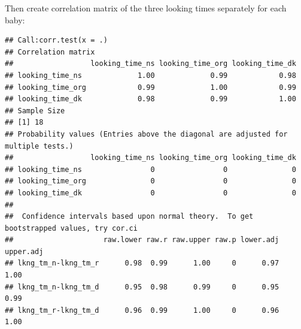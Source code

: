 \documentclass[
]{book}
\newenvironment{Shaded}{\begin{snugshade}}{\end{snugshade}}
\newcommand{\DataTypeTok}[1]{\textcolor[rgb]{0.13,0.29,0.53}{#1}}
\newcommand{\KeywordTok}[1]{\textcolor[rgb]{0.13,0.29,0.53}{\textbf{#1}}}
\newcommand{\NormalTok}[1]{#1}
\newcommand{\OperatorTok}[1]{\textcolor[rgb]{0.81,0.36,0.00}{\textbf{#1}}}
\newcommand{\OtherTok}[1]{\textcolor[rgb]{0.56,0.35,0.01}{#1}}
\newcommand{\StringTok}[1]{\textcolor[rgb]{0.31,0.60,0.02}{#1}}
\begin{document}
Then create correlation matrix of the three looking times separately for each baby:

\begin{Shaded}
\end{Shaded}

\begin{verbatim}
## Call:corr.test(x = .)
## Correlation matrix 
##                  looking_time_ns looking_time_org looking_time_dk
## looking_time_ns             1.00             0.99            0.98
## looking_time_org            0.99             1.00            0.99
## looking_time_dk             0.98             0.99            1.00
## Sample Size 
## [1] 18
## Probability values (Entries above the diagonal are adjusted for multiple tests.) 
##                  looking_time_ns looking_time_org looking_time_dk
## looking_time_ns                0                0               0
## looking_time_org               0                0               0
## looking_time_dk                0                0               0
## 
##  Confidence intervals based upon normal theory.  To get bootstrapped values, try cor.ci
##                     raw.lower raw.r raw.upper raw.p lower.adj upper.adj
## lkng_tm_n-lkng_tm_r      0.98  0.99      1.00     0      0.97      1.00
## lkng_tm_n-lkng_tm_d      0.95  0.98      0.99     0      0.95      0.99
## lkng_tm_r-lkng_tm_d      0.96  0.99      1.00     0      0.96      1.00
\end{verbatim}

\begin{Shaded}
\end{Shaded}
\end{document}
